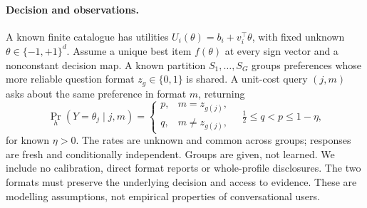 \documentclass[sigconf,anonymous,review]{acmart}
\begin{document}
\paragraph{Decision and observations.}
A known finite catalogue has utilities $U_i(\theta)=b_i+v_i^\top\theta$, with fixed unknown $\theta\in\{-1,+1\}^d$. Assume a unique best item $f(\theta)$ at every sign vector and a nonconstant decision map. A known partition $S_1,\ldots,S_G$ groups preferences whose more reliable question format $z_g\in\{0,1\}$ is shared. A unit-cost query $(j,m)$ asks about the same preference in format $m$, returning
\begin{equation}\label{eq:channel}
 \Pr_h(Y=\theta_j\mid j,m)=
 \begin{cases}p,&m=z_{g(j)},\\q,&m\ne z_{g(j)},\end{cases}
 \quad \tfrac12\le q<p\le1-\eta,
\end{equation}
for known $\eta>0$. The rates are unknown and common across groups; responses are fresh and conditionally independent. Groups are given, not learned. We include no calibration, direct format reports or whole-profile disclosures. The two formats must preserve the underlying decision and access to evidence. These are modelling assumptions, not empirical properties of conversational users.
\end{document}
